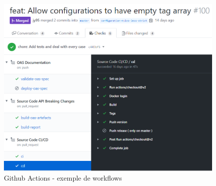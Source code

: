 \begin{figure}[H]
    \includegraphics[width=\textwidth,height=\textheight,keepaspectratio]{images/serveur/workflowGithubActions.PNG}
    \centering
    \caption{Github Actions - exemple de workflows}
    \label{fig:GithubActionsExample}
\end{figure}